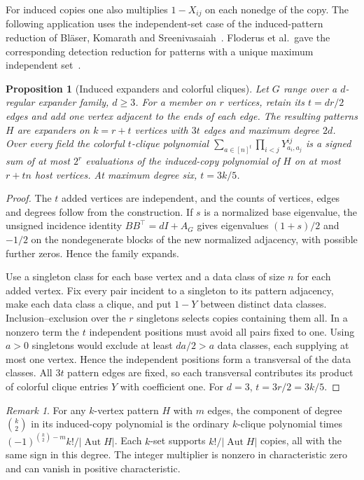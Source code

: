 \documentclass[11pt]{article}
\newtheorem{proposition}[theorem]{Proposition}
\theoremstyle{remark}
\newtheorem*{remark}{Remark}
\begin{document}
For induced copies one also multiplies $1-X_{ij}$ on each nonedge of the copy. The following application uses the independent-set case of the induced-pattern reduction of Bl\"aser, Komarath and Sreenivasaiah~\cite[Theorem~6.1]{graph-pattern-polynomials}. Floderus et al.\ gave the corresponding detection reduction for patterns with a unique maximum independent set~\cite{induced}.

\begin{proposition}[Induced expanders and colorful cliques]\label{inducedclique}
Let $G$ range over a $d$-regular expander family, $d\ge3$. For a member on $r$ vertices, retain its $t=dr/2$ edges and add one vertex adjacent to the ends of each edge. The resulting patterns $H$ are expanders on $k=r+t$ vertices with $3t$ edges and maximum degree $2d$. Over every field the colorful $t$-clique polynomial $\sum_{a\in[n]^t}\prod_{i<j}Y^{ij}_{a_i,a_j}$ is a signed sum of at most $2^r$ evaluations of the induced-copy polynomial of $H$ on at most $r+tn$ host vertices. At maximum degree six, $t=3k/5$.
\end{proposition}
\begin{proof}
The $t$ added vertices are independent, and the counts of vertices, edges and degrees follow from the construction. If $s$ is a normalized base eigenvalue, the unsigned incidence identity $BB^\top=dI+A_G$ gives eigenvalues $(1+s)/2$ and $-1/2$ on the nondegenerate blocks of the new normalized adjacency, with possible further zeros. Hence the family expands.

Use a singleton class for each base vertex and a data class of size $n$ for each added vertex. Fix every pair incident to a singleton to its pattern adjacency, make each data class a clique, and put $1-Y$ between distinct data classes. Inclusion--exclusion over the $r$ singletons selects copies containing them all. In a nonzero term the $t$ independent positions must avoid all pairs fixed to one. Using $a>0$ singletons would exclude at least $da/2>a$ data classes, each supplying at most one vertex. Hence the independent positions form a transversal of the data classes. All $3t$ pattern edges are fixed, so each transversal contributes its product of colorful clique entries $Y$ with coefficient one. For $d=3$, $t=3r/2=3k/5$.
\end{proof}

\begin{remark}
For any $k$-vertex pattern $H$ with $m$ edges, the component of degree $\binom{k}{2}$ in its induced-copy polynomial is the ordinary $k$-clique polynomial times $(-1)^{\binom{k}{2}-m} k!/|\operatorname{Aut}H|$. Each $k$-set supports $k!/|\operatorname{Aut}H|$ copies, all with the same sign in this degree. The integer multiplier is nonzero in characteristic zero and can vanish in positive characteristic.
\end{remark}
\end{document}
